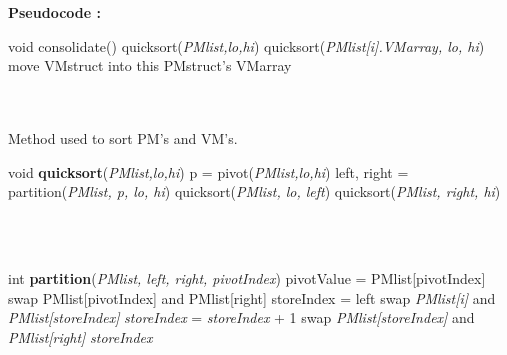 \documentclass[a4paper,11pt]{article}
\begin{document}
\textbf{Pseudocode :}
\begin{algorithmic}[1]
\STATE void consolidate()
\STATE quicksort(\emph{PMlist,lo,hi}) 
\STATE quicksort(\emph{PMlist[i].VMarray, lo, hi}) 
\STATE move VMstruct into this PMstruct's VMarray
\ENDIF
\ENDFOR
\ENDFOR
\ENDFOR
\end{algorithmic}
\mbox{}\\\\
Method used to sort PM's and VM's.
\begin{algorithmic}[1]
\STATE void \textbf{quicksort}(\emph{PMlist,lo,hi})
\STATE p = pivot(\emph{PMlist,lo,hi})
\STATE left, right = partition(\emph{PMlist, p, lo, hi})
\STATE quicksort(\emph{PMlist, lo, left})
\STATE quicksort(\emph{PMlist, right, hi})
\ENDIF
\end{algorithmic}
\mbox{}\\\\
\begin{algorithmic}[1]
\STATE int \textbf{partition}(\emph{PMlist, left, right, pivotIndex})
\STATE pivotValue = PMlist[pivotIndex]
\STATE swap PMlist[pivotIndex] and PMlist[right]
\STATE storeIndex = left
\STATE swap \emph{PMlist[i]} and \emph{PMlist[storeIndex]}
\STATE \emph{storeIndex} = \emph{storeIndex} + 1
\ENDIF
\STATE swap \emph{PMlist[storeIndex]} and \emph{PMlist[right]}
\ENDFOR
\RETURN \emph{storeIndex}
\end{algorithmic}
\end{document}
